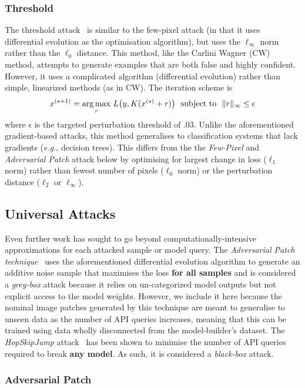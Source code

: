 \subsubsection{Threshold}
The threshold attack~\cite{pixelattack} is similar to the few-pixel attack (in that it uses differential evolution as the optimisation algorithm), but uses the $\ell_{\infty}$ norm rather than the $\ell_0$ distance.
This method, like the Carlini Wagner (CW) method, attempts to generate examples that are both false and highly confident.
However, it uses a complicated algorithm (differential evolution) rather than simple, linearized methods (as in CW).
The iteration scheme is
$$
    x^{(s+1)} = \operatorname*{arg\,max}_r \, L\big(y, K(x^{(s)} + r)\big) \text{~~subject~to~~}  \|r\|_{\infty} \leq \epsilon
$$
where $\epsilon$ is the targeted perturbation threshold of .03.
Unlike the aforementioned gradient-based attacks, this method generalises to classification systems that lack gradients (\textit{e.g.}, decision trees).
This differs from the the \textit{Few-Pixel} and \textit{Adversarial Patch} attack below by optimising for largest change in loss ($\ell_{1}$ norm) rather than fewest number of pixels ($\ell_{0}$ norm) or the perturbation distance ($\ell_2$ or $\ell_{\infty}$).

\subsection{Universal Attacks}
\label{universal}

Even further work has sought to go beyond computationally-intensive approximations for each attacked sample or model query.
The \textit{Adversarial Patch technique}~\cite{adversarialpatch} uses the aforementioned differential evolution algorithm to generate an additive noise sample that maximises the loss \textbf{for all samples} and is considered a \textit{grey-box} attack because it relies on un-categorized model outputs but not explicit access to the model weights.
However, we include it here because the nominal image patches generated by this technique are meant to generalise to unseen data as the number of API queries increases, meaning that this can be trained using data wholly disconnected from the model-builder's dataset.
The \textit{HopSkipJump} attack~\cite{hopskipjump} has been shown to minimise the number of API queries required to break \textbf{any model}.
As such, it is considered a \textit{black-box} attack.



\subsubsection{Adversarial Patch}

